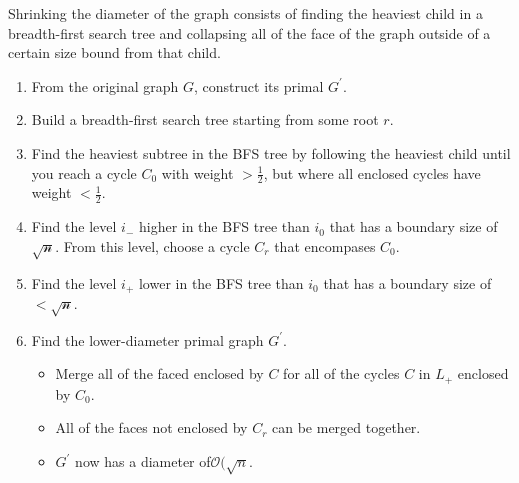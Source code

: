\documentclass[12pt]{article}
\newtheorem{lemma}[theorem]{Lemma}
\begin{document}


    Shrinking the diameter of the graph consists of finding the heaviest child in a breadth-first search tree and collapsing all of the face of the graph outside of a certain size bound from that child.
    \begin{enumerate}
      \item From the original graph $G$, construct its primal $G^{'}$.

      \item Build a breadth-first search tree starting from some root $r$.

      \item Find the heaviest subtree in the BFS tree by following the heaviest child until you reach a cycle $C_0$ with weight $> \frac{1}{2}$, but where all enclosed cycles have weight $< \frac{1}{2}$.

      \item Find the level $i_-$ higher in the BFS tree than $i_0$ that has a boundary size of $\mathcal{\sqrt{n}}$. From this level, choose a cycle $C_r$ that encompases $C_0$.

      \item Find the level $i_+$ lower in the BFS tree than $i_0$ that has  a boundary size of $< \mathcal{\sqrt{n}}$.

      \item Find the lower-diameter primal graph $G^{'}$.
      \begin{itemize}
        \item Merge all of the faced enclosed by $C$ for all of the cycles $C$ in $L_+$ enclosed by $C_0$.

        \item All of the faces not enclosed by $C_r$ can be merged together.

        \item $G^{'}$ now has a diameter of$\mathcal{O}(\sqrt{n}$.
      \end{itemize}
    \end{enumerate}
\end{document}
